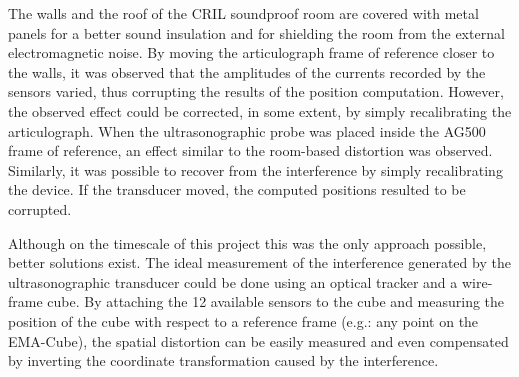 
The walls and the roof of the CRIL soundproof room are covered with metal 
panels for a better sound insulation and for shielding the room from the
external electromagnetic noise.
By moving the articulograph frame of reference closer to the walls, 
it was
observed that the amplitudes of the currents recorded by the sensors varied, 
thus corrupting the results of the position computation.
However, the observed effect could be corrected, in some extent, by simply 
recalibrating the articulograph.
When the ultrasonographic probe was placed inside the AG500 frame of
reference, an effect similar to the room-based distortion was observed.
Similarly, it was possible to recover from the interference by simply
recalibrating the device.
If the transducer moved, the computed positions resulted to be corrupted.


Although on the timescale of this project this was the only approach 
possible, better solutions exist.
The ideal measurement of the interference generated by the ultrasonographic
transducer could be done using an optical tracker and a wire-frame cube.
By attaching the 12 available sensors to the cube and measuring the position 
of the cube with respect to a reference frame (e.g.: any point on the  
EMA-Cube), the spatial distortion can be easily measured and even compensated by
inverting the coordinate transformation caused by the interference.

